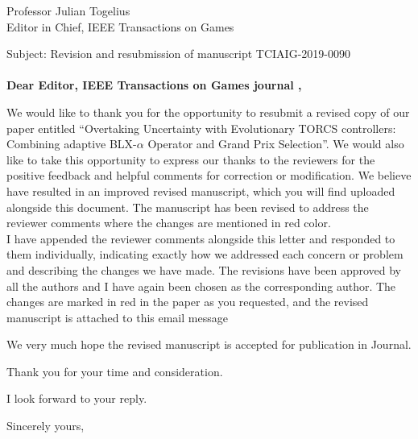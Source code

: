 \documentclass[10pt]{letter} %
\begin{document}

\begin{letter}{Professor Julian Togelius \\ Editor in Chief, IEEE Transactions on Games} %

\opening{Subject: Revision and resubmission of manuscript TCIAIG-2019-0090\\
	\\	
\textbf{Dear Editor,  IEEE Transactions on Games journal ,}}


We would like to thank you for the opportunity to resubmit a revised copy of our paper entitled “Overtaking Uncertainty with Evolutionary TORCS controllers: Combining adaptive BLX-$\alpha$ Operator and Grand Prix Selection”. We would also like to take this opportunity to express our thanks to the reviewers for the positive feedback and helpful comments for correction or modification.
We believe have resulted in an improved revised manuscript, which you will find uploaded alongside this document. The manuscript has been revised to address the reviewer comments where the changes are mentioned in red color.\\
I have appended the reviewer comments alongside this letter and responded to them individually, indicating exactly how we addressed each concern or problem and describing the changes we have made. The revisions have been approved by all the authors and I have again been chosen as the corresponding author. The changes are marked in red in the paper as you requested, and the revised manuscript is attached to this email message

We very much hope the revised manuscript is accepted for publication in Journal.

Thank you for your time and consideration.

I look forward to your reply.

\vspace{2\parskip} %
\closing{Sincerely yours,}
\vspace{2\parskip} %


\end{letter}
\end{document}
